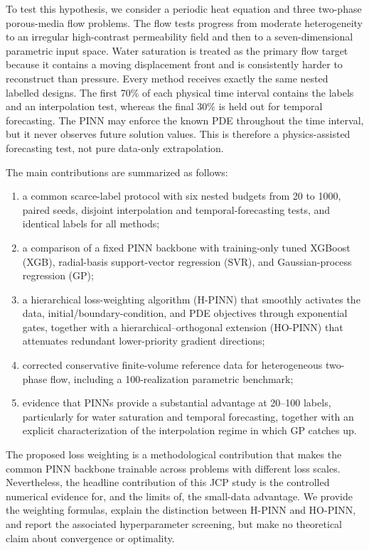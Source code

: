 To test this hypothesis, we consider a periodic heat equation and three two-phase porous-media flow problems. The flow tests progress from moderate heterogeneity to an irregular high-contrast permeability field and then to a seven-dimensional parametric input space. Water saturation is treated as the primary flow target because it contains a moving displacement front and is consistently harder to reconstruct than pressure. Every method receives exactly the same nested labelled designs. The first 70\% of each physical time interval contains the labels and an interpolation test, whereas the final 30\% is held out for temporal forecasting. The PINN may enforce the known PDE throughout the time interval, but it never observes future solution values. This is therefore a physics-assisted forecasting test, not pure data-only extrapolation.

The main contributions are summarized as follows:
\begin{enumerate}[leftmargin=*]
    \item a common scarce-label protocol with six nested budgets from 20 to 1000, paired seeds, disjoint interpolation and temporal-forecasting tests, and identical labels for all methods;
    \item a comparison of a fixed PINN backbone with training-only tuned XGBoost (XGB), radial-basis support-vector regression (SVR), and Gaussian-process regression (GP);
    \item a hierarchical loss-weighting algorithm (H-PINN) that smoothly activates the data, initial/boundary-condition, and PDE objectives through exponential gates, together with a hierarchical--orthogonal extension (HO-PINN) that attenuates redundant lower-priority gradient directions;
    \item corrected conservative finite-volume reference data for heterogeneous two-phase flow, including a 100-realization parametric benchmark;
    \item evidence that PINNs provide a substantial advantage at 20--100 labels, particularly for water saturation and temporal forecasting, together with an explicit characterization of the interpolation regime in which GP catches up.
\end{enumerate}

The proposed loss weighting is a methodological contribution that makes the common PINN backbone trainable across problems with different loss scales. Nevertheless, the headline contribution of this JCP study is the controlled numerical evidence for, and the limits of, the small-data advantage. We provide the weighting formulas, explain the distinction between H-PINN and HO-PINN, and report the associated hyperparameter screening, but make no theoretical claim about convergence or optimality.
